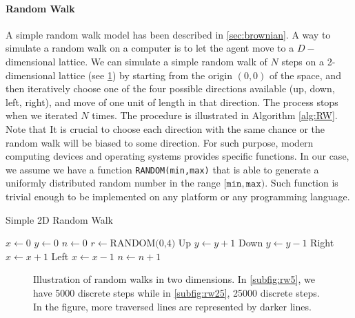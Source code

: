 \paragraph{Random Walk}
A simple random walk model has been described in \sectionname\ref{sec:brownian}.
A way to simulate a random walk on a computer is to let the agent move to a $D-$dimensional lattice. We can simulate a simple random walk of $N$ steps on a 2-dimensional lattice (see \figurename\ref{fig:rw}) by starting from the origin $(0,0)$ of the space, and then iteratively choose one of the four possible directions available (up, down, left, right), and move of one unit of length in that direction. The process stops when we iterated $N$ times. The procedure is illustrated in Algorithm \ref{alg:RW}. Note that It is crucial to choose each direction with the same chance or the random walk will be biased to some direction. For such purpose, modern computing devices and operating systems provides specific functions. In our case, we assume we have a function \texttt{RANDOM(min,max)} that is able to generate a uniformly distributed random number in the range $[\texttt{min},\texttt{max})$. Such function is trivial enough to be implemented on any platform or any programming language.

\begin{algorithm}
\caption{Simple 2D Random Walk}
\label{alg:RW}
\begin{algorithmic}[1]
\State $x \gets 0$
\State $y \gets 0$
\State $n \gets 0$
		\State $r \gets \text{RANDOM(0,4)}$
		 \Comment Up
			\State $y \gets y + 1$
		 \Comment Down
			\State $y \gets y - 1$
		 \Comment Right
			\State $x \gets x + 1$
		 \Comment Left
			\State $x \gets x - 1$
		\EndIf
	\State $n \gets n+1$
	\EndWhile
\EndProcedure
\end{algorithmic}
\end{algorithm}


\begin{figure}[ht]
\centering
\caption{Illustration of random walks in two dimensions. In \ref{subfig:rw5}, we have 5000 discrete steps while in \ref{subfig:rw25}, 25000 discrete steps. In the figure, more traversed lines are represented by darker lines.}
\label{fig:rw}
\end{figure}

